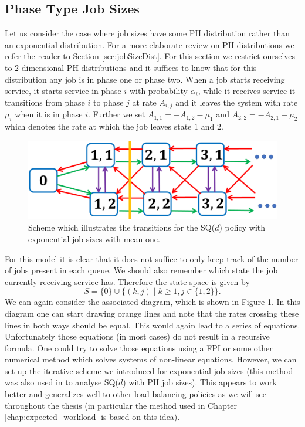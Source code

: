 \documentclass[12pt]{report}
\begin{document}
\subsection{Phase Type Job Sizes}\label{sec:SQd_PH_intuition}
Let us consider the case where job sizes have some PH distribution rather than an exponential distribution. For a more elaborate review on PH distributions we refer the reader to Section \ref{sec:jobSizeDist}. For this section we restrict ourselves to $2$ dimensional PH distributions and it suffices to know that for this distribution any job is in phase one or phase two.  When a job starts receiving service, it starts service in phase $i$ with probability $\alpha_i$, while it receives service it transitions from phase $i$ to phase $j$ at rate $A_{i,j}$ and it leaves the system with rate $\mu_i$ when it is in phase $i$. Further we set $A_{1,1} = - A_{1,2} - \mu_1$ and $A_{2,2} = - A_{2,1} - \mu_2$ which denotes the rate at which the job leaves state $1$ and $2$.

\begin{figure}
	\begin{center}
		\includegraphics[scale=0.6]{figures/Chapter1/SQd_schema_PH.PNG}
	\end{center}	
	\caption{Scheme which illustrates the transitions for the SQ($d$) policy with exponential job sizes with mean one.} \label{fig:scheme_SQd_PH}
\end{figure}
For this model it is clear that it does not suffice to only keep track of the number of jobs present in each queue. We should also remember which state the job currently receiving service has. Therefore the state space is given by 
$$
S = \{0\} \cup \{ (k,j) \mid k \geq 1, j \in \{1, 2\} \}.
$$
We can again consider the associated diagram, which is shown in Figure \ref{fig:scheme_SQd_PH}. In this diagram one can start drawing orange lines and note that the rates crossing these lines in both ways should be equal. This would again lead to a series of equations. Unfortunately those equations (in most cases) do not result in a recursive formula. One could try to solve those equations using a FPI or some other numerical method which solves systems of non-linear equations. However, we can set up the iterative scheme we introduced for exponential job sizes (this method was also used in \cite{van2018impact} to analyse SQ($d$) with PH job sizes). This appears to work better and generalizes well to other load balancing policies as we will see throughout the thesis (in particular the method used in Chapter \ref{chap:expected_workload} is based on this idea).
\end{document}

